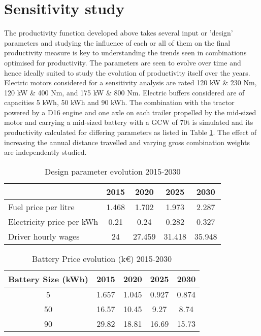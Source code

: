 \documentclass[ExampleMasters.tex]{subfiles}
\begin{document}
	\section{Sensitivity study}
	The productivity function developed above takes several input or 'design' parameters and studying the influence of each or all of them on the final productivity measure is key to understanding the trends seen in combinations optimised for productivity. The parameters are seen to evolve over time and hence ideally suited to study the evolution of productivity itself over the years. Electric motors considered for a sensitivity analysis are rated 120 kW \& 230 Nm, 120 kW \& 400 Nm, and 175 kW \& 800 Nm. Electric buffers considered are of capacities 5 kWh, 50 kWh and 90 kWh. The combination with the tractor powered by a D16 engine and one axle on each trailer propelled by the mid-sized motor and carrying a mid-sized battery with a GCW of 70t is simulated and its productivity calculated for differing parameters as listed in Table \ref{table:ParameterSensitivity}. The effect of increasing the annual distance travelled and varying gross combination weights are independently studied. \\ 


	\begin{table}[ht]
			\centering 
			\begin{tabular}{l c c c c}
				\cline{2-5}
				\ & 2015 & 2020 & 2025 & 2030\\ 
				\hline
				Fuel price per litre & 1.468 & 1.702 & 1.973 & 2.287\\
				Electricity price per kWh & 0.21 & 0.24 & 0.282 & 0.327\\
			    Driver hourly wages  & 24 & 27.459 & 31.418 & 35.948\\
				\hline 
			\end{tabular}
			\caption{Design parameter evolution 2015-2030 \cite{ElementEnergy}} 
			\label{table:ParameterSensitivity} 
		\end{table}

	\begin{table}[ht]
		\centering 
		\begin{tabular}{c c c c c}
			\hline
			Battery Size (kWh) & 2015 & 2020 & 2025 & 2030\\ 
			\hline
			5 & 1.657 & 1.045 & 0.927 & 0.874\\
			50 & 16.57 & 10.45 & 9.27 & 8.74\\
			90 & 29.82 & 18.81 & 16.69 & 15.73\\
			\hline 
		\end{tabular}
		\caption{Battery Price evolution (k\euro) 2015-2030 \cite{ElementEnergy}} 
		\label{table:ParameterSensitivityBattery} 
	\end{table}
\end{document}

